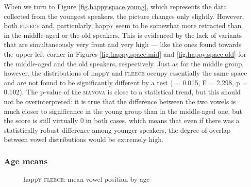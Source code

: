 When we turn to Figure \ref{fig.happy.space.young}, which represents the data collected from the youngest speakers, the picture changes only slightly.
However, both \textsc{fleece} and, particularly, happ\textsc{y} seem to be somewhat more retracted than in the middle-aged or the old speakers.
This is evidenced by the lack of variants that are simultaneously very front and very high --- like the ones found towards the upper left corner in Figures \ref{fig.happy.space.mid} and \ref{fig.happy.space.old} for the middle-aged and the old speakers, respectively.
Just as for the middle group, however, the distributions of happ\textsc{y} and \textsc{fleece} occupy essentially the same space and are not found to be significantly different by a  test ( = 0.015, F = 2.298, p = 0.102).
The p-value of the \textsc{manova} is close to a statistical trend, but this should not be overinterpreted: it is true that the difference between the two vowels is much closer to significance in the young group than in the middle-aged one, but the  score is still virtually 0 in both cases, which means that even if there was a statistically robust difference among younger speakers, the degree of overlap between vowel distributions would be extremely high.

\subsubsection{Age means}

\begin{figure}[h!]
	\centering
	
	\caption{happ\textsc{y}-\textsc{fleece}: mean vowel position by age}
	\label{fig.happy.space.means}
\end{figure}

